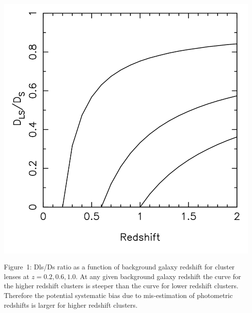 \documentclass[a4paper,11pt]{article}
\begin{document}
\noindent
\begin{minipage}{60mm}
    \includegraphics[width=\hsize]{dlsds.png}
\end{minipage}
\hspace{5mm}
\begin{minipage}{105mm}
  Figure~1: Dls/Ds ratio as a function of background galaxy redshift
  for cluster lenses at $z=0.2,0.6,1.0$. At any given background
  galaxy redshift the curve for the higher redshift clusters is
  steeper than the curve for lower redshift clusters.  Therefore the
  potential systematic bias due to mis-estimation of photometric
  redshifts is larger for higher redshift clusters.
\end{minipage}
\end{document}
